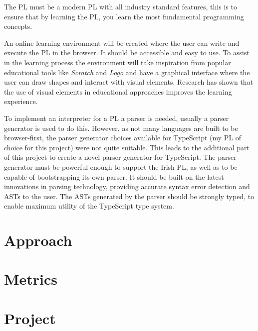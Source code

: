 The PL must be a modern PL with all industry standard features, this is to ensure that by learning the PL, you learn the most fundamental programming concepts.

An online learning environment will be created where the user can write and execute the PL in the browser. It should be accessible and easy to use. To assist in the learning process the environment will take inspiration from popular educational tools like \emph{Scratch} and \emph{Logo} and have a graphical interface where the user can draw shapes and interact with visual elements. Research has shown that the use of visual elements in educational approaches improves the learning experience\cite{graphiclearning}.

To implement an interpreter for a PL a parser is needed, usually a parser generator is used to do this. However, as not many languages are built to be browser-first, the parser generator choices available for TypeScript (my PL of choice for this project) were not quite suitable. This leads to the additional part of this project to create a novel parser generator for TypeScript. The parser generator must be powerful enough to support the Irish PL, as well as to be capable of bootstrapping its own parser. It should be built on the latest innovations in parsing technology, providing accurate syntax error detection and ASTs to the user. The ASTs generated by the parser should be strongly typed, to enable maximum utility of the TypeScript type system.
\section{Approach}
\section{Metrics}
\section{Project}
